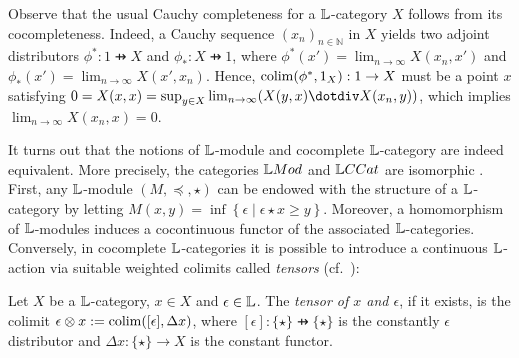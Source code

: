 Observe that the usual Cauchy completeness for a $\mathbb{L}$-category $X$ follows from its cocompleteness. Indeed, a Cauchy sequence $(x_{n})_{n\in \mathbb N}$ in $X$ yields two adjoint distributors $\phi^{*}:1\pfun X$ and $\phi_{*}:X\pfun 1$, where 
$\phi^{*}(x')=\lim_{n\to \infty}X(x_{n},x')$ and
$\phi_{*}(x')=\lim_{n\to \infty}X(x',x_{n})$. Hence,  
$\mathrm{colim}(\phi^{*},1_{X}):1\to X$ must be a point $x$ satisfying $0=X(x,x)=\sup_{y\in X}\lim_{n\to \infty}(X(y,x)\menus X(x_{n},y))$, which implies $\lim_{n\to \infty}X(x_{n},x)=0$. 





It turns out that the notions of $\mathbb{L}$-module and cocomplete $\mathbb{L}$-category are indeed equivalent. More precisely, the categories $\Mod$ and $\GMet$ are isomorphic \cite{Stubbe2006}. 
First, any $\mathbb{L}$-module $(M,\preceq, \star)$ can be endowed with the structure of a $\mathbb{L}$-category by letting
$M(x,y) = \inf\left\{ \epsilon \mid \epsilon \star x\geq y\right\}$. Moreover, a homomorphism of $\mathbb{L}$-modules induces a cocontinuous functor of the associated $\mathbb{L}$-categories. 
Conversely, in cocomplete $\mathbb{L}$-categories it is possible to introduce a continuous $\mathbb{L}$-action
via suitable weighted colimits called \emph{tensors} (cf.~\cite{Stubbe2014}):

\begin{definition}[tensors]
Let $X$ be a $\mathbb{L}$-category, $x\in X$ and $\epsilon \in \mathbb{L}$. The \emph{tensor of $x$ and $\epsilon$}, if it exists, is the colimit $\epsilon \otimes x:= \mathrm{colim}( [\epsilon],\Delta x)$, where
$[\epsilon]: \{\star\}\pfun \{\star\}$ is the constantly $\epsilon$ distributor
and $\Delta x:\{\star\}\to X$ is the constant functor. 
\end{definition}

